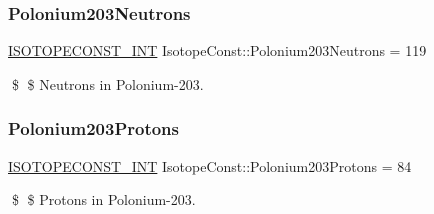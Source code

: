 \subsubsection{\texorpdfstring{Polonium203\+Neutrons}{Polonium203Neutrons}}
{\footnotesize\ttfamily \mbox{\hyperlink{group___isotope_const-_macros_ga5f18360b3e99483a35c32d789e62621c}{I\+S\+O\+T\+O\+P\+E\+C\+O\+N\+S\+T\+\_\+\+I\+NT}} Isotope\+Const\+::\+Polonium203\+Neutrons = 119}

\$ \$ Neutrons in Polonium-\/203. \mbox{\label{group___isotope_const-_polonium-_po203_ga0ed0792985d9912199b290924bc2a84c}} 
\subsubsection{\texorpdfstring{Polonium203\+Protons}{Polonium203Protons}}
{\footnotesize\ttfamily \mbox{\hyperlink{group___isotope_const-_macros_ga5f18360b3e99483a35c32d789e62621c}{I\+S\+O\+T\+O\+P\+E\+C\+O\+N\+S\+T\+\_\+\+I\+NT}} Isotope\+Const\+::\+Polonium203\+Protons = 84}

\$ \$ Protons in Polonium-\/203. 